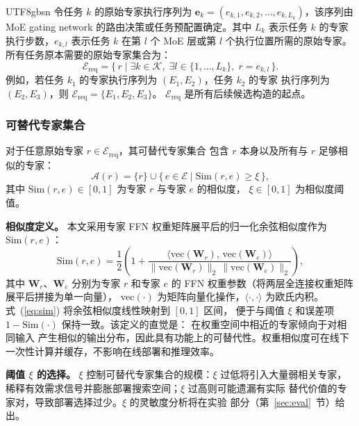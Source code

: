 \documentclass[conference]{IEEEtran}
\begin{document}
\begin{CJK*}{UTF8}{gbsn}
令任务 $k$ 的原始专家执行序列为
$\mathbf{e}_k=(e_{k,1},e_{k,2},\ldots,e_{k,L_k})$，该序列由 MoE
gating network 的路由决策或任务预配置确定。其中 $L_k$ 表示任务 $k$
的专家执行步数，$e_{k,l}$ 表示任务 $k$ 在第 $l$ 个 MoE 层或第 $l$
个执行位置所需的原始专家。所有任务原本需要的原始专家集合为：
\begin{equation}
\mathcal{E}_{\mathrm{req}}
= \{\,r \mid \exists k\in\mathcal{K},\;
\exists l\in\{1,\ldots,L_k\},\; r=e_{k,l}\,\}.
\label{eq:ereq}
\end{equation}
例如，若任务 $k_1$ 的专家执行序列为 $(E_1,E_2)$，任务 $k_2$ 的专家
执行序列为 $(E_2,E_3)$，则
$\mathcal{E}_{\mathrm{req}} = \{E_1, E_2, E_3\}$。
$\mathcal{E}_{\mathrm{req}}$ 是所有后续候选构造的起点。

\subsubsection{可替代专家集合}

对于任意原始专家 $r\in\mathcal{E}_{\mathrm{req}}$，其可替代专家集合
包含 $r$ 本身以及所有与 $r$ 足够相似的专家：
\begin{equation}
\mathcal{A}(r) = \{r\} \cup \{\,e\in\mathcal{E} \mid \mathrm{Sim}(r,e) \ge \xi\,\},
\label{eq:ar}
\end{equation}
其中 $\mathrm{Sim}(r,e)\in[0,1]$ 为专家 $r$ 与专家 $e$ 的相似度，
$\xi\in[0,1]$ 为相似度阈值。

\textbf{相似度定义。}
本文采用专家 FFN 权重矩阵展平后的归一化余弦相似度作为 $\mathrm{Sim}(r,e)$：
\begin{equation}
\mathrm{Sim}(r,e) =
\frac{1}{2}\left(
1+
\frac{\bigl\langle \mathrm{vec}(\mathbf{W}_r),\,
                \mathrm{vec}(\mathbf{W}_e) \bigr\rangle}
     {\|\mathrm{vec}(\mathbf{W}_r)\|_2\,
      \|\mathrm{vec}(\mathbf{W}_e)\|_2}
\right),
\label{eq:sim}
\end{equation}
其中 $\mathbf{W}_r$、$\mathbf{W}_e$ 分别为专家 $r$ 和专家 $e$ 的 FFN
权重参数（将两层全连接权重矩阵展平后拼接为单一向量），
$\mathrm{vec}(\cdot)$ 为矩阵向量化操作，$\langle\cdot,\cdot\rangle$
为欧氏内积。式~(\ref{eq:sim}) 将余弦相似度线性映射到 $[0,1]$ 区间，
便于与阈值 $\xi$ 和误差项 $1-\mathrm{Sim}(\cdot)$ 保持一致。该定义的直觉是：
在权重空间中相近的专家倾向于对相同输入
产生相似的输出分布，因此具有功能上的可替代性。权重相似度可在线下
一次性计算并缓存，不影响在线部署和推理效率。

\textbf{阈值 $\xi$ 的选择。}
$\xi$ 控制可替代专家集合的规模：$\xi$ 过低将引入大量弱相关专家，
稀释有效需求信号并膨胀部署搜索空间；$\xi$ 过高则可能遗漏有实际
替代价值的专家对，导致部署选择过少。$\xi$ 的灵敏度分析将在实验
部分（第~\ref{sec:eval}~节）给出。


\end{CJK*}
\end{document}
